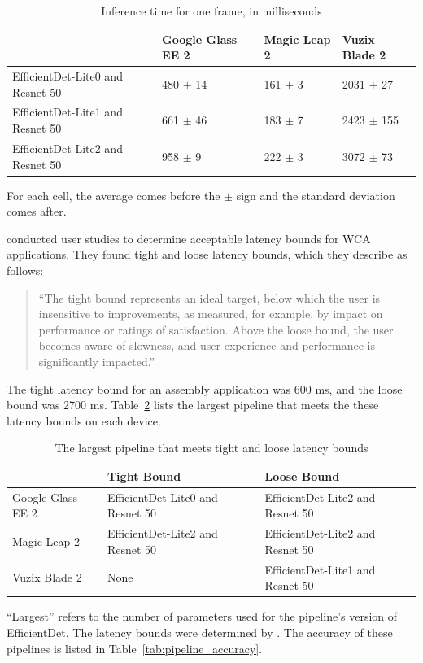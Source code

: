 \begin{table}
\begin{tabular}{|l||l|l|l|}
  \hline
  & Google Glass EE 2 & Magic Leap 2 & Vuzix Blade 2\\
  \hline
  \hline
  EfficientDet-Lite0 and Resnet 50 & 480 $\pm$ 14 & 161 $\pm$ 3 & 2031 $\pm$ 27\\
  EfficientDet-Lite1 and Resnet 50 & 661 $\pm$ 46 & 183 $\pm$ 7 & 2423 $\pm$ 155\\
  EfficientDet-Lite2 and Resnet 50 & 958 $\pm$ 9 & 222 $\pm$ 3 & 3072 $\pm$ 73\\
  \hline
\end{tabular}
\begin{captiontext}
    For each cell, the average comes before the $\pm$ sign and the standard
    deviation comes after.
  \end{captiontext}
  \caption{
    Inference time for one frame, in milliseconds
  }\label{tab:mobile_inference}
\end{table}

\citet{chen2017} conducted user studies to determine acceptable latency bounds
for WCA applications.
They found tight and loose latency bounds, which they describe as follows:
\begin{quotation}
``The tight bound represents an ideal target, below which the
user is insensitive to improvements, as measured, for example,
by impact on performance or ratings of satisfaction. Above
the loose bound, the user becomes aware of slowness, and
user experience and performance is significantly impacted.''
\end{quotation}
The tight latency bound for an assembly application was 600 ms, and the loose
bound was 2700 ms.
Table~\ref{tab:mobile_accuracy} lists the largest pipeline
that meets the these latency bounds on each device.

\begin{table}
\begin{tabular}{|l||l|l|}
  \hline
  & Tight Bound & Loose Bound\\
  \hline
  \hline
  Google Glass EE 2 & EfficientDet-Lite0 and Resnet 50 & EfficientDet-Lite2 and Resnet 50\\
  Magic Leap 2 & EfficientDet-Lite2 and Resnet 50 & EfficientDet-Lite2 and Resnet 50\\
  Vuzix Blade 2 & None & EfficientDet-Lite1 and Resnet 50\\
  \hline
\end{tabular}
\begin{captiontext}
  ``Largest'' refers to the number of parameters used for the pipeline's version
  of EfficientDet.
  The latency bounds were determined by \citet{chen2017}.
  The accuracy of these pipelines is listed in
  Table~\ref{tab:pipeline_accuracy}.
  \end{captiontext}
\caption{
  The largest pipeline that meets tight and loose latency bounds
  }\label{tab:mobile_accuracy}
\end{table}


